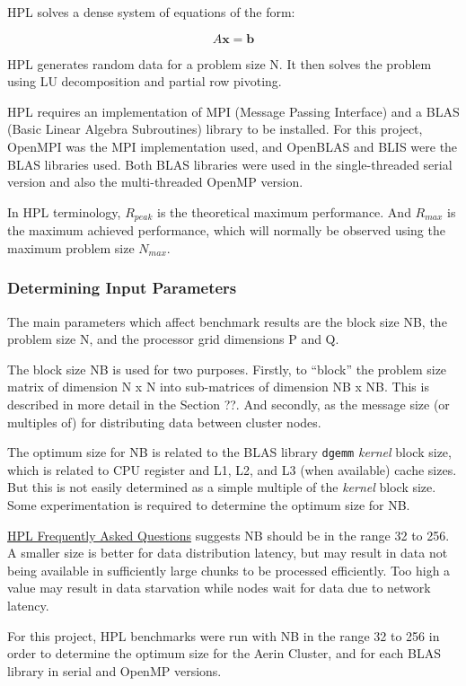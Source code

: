 HPL solves a dense system of equations of the form:

\[A\mathbf{x}=\mathbf{b}\]

HPL generates random data for a problem size N. It then solves the problem using LU decomposition and partial row pivoting.

HPL requires an implementation of MPI (Message Passing Interface) and a BLAS (Basic Linear Algebra Subroutines) library to be installed. For this project, OpenMPI was the MPI implementation used, and OpenBLAS and BLIS were the BLAS libraries used. Both BLAS libraries were used in the single-threaded serial version and also the multi-threaded OpenMP version.

In HPL terminology, $R_{peak}$ is the theoretical maximum performance. And $R_{max}$ is the maximum achieved performance, which will normally be observed using the maximum problem size $N_{max}$.


%
%
\subsubsection{Determining Input Parameters}

The main parameters which affect benchmark results are the block size NB, the problem size N, and the processor grid dimensions P and Q.

The block size NB is used for two purposes. Firstly, to ``block'' the problem size matrix of dimension N x N into sub-matrices of dimension NB x NB. This is described in more detail in the Section ??. And secondly, as the message size (or multiples of) for distributing data between cluster nodes.

The optimum size for NB is related to the BLAS library \verb|dgemm| \emph{kernel} block size, which is related to CPU register and L1, L2, and L3 (when available) cache sizes. But this is not easily determined as a simple multiple of the \emph{kernel} block size. Some experimentation is required to determine the optimum size for NB.

\href{https://www.netlib.org/benchmark/hpl/faqs.html}{HPL Frequently Asked Questions} suggests NB should be in the range 32 to 256. A smaller size is better for data distribution latency, but may result in data not being available in sufficiently large chunks to be processed efficiently. Too high a value may result in data starvation while nodes wait for data due to network latency.

For this project, HPL benchmarks were run with NB in the range 32 to 256 in order to determine the optimum size for the Aerin Cluster, and for each BLAS library in serial and OpenMP versions. 

